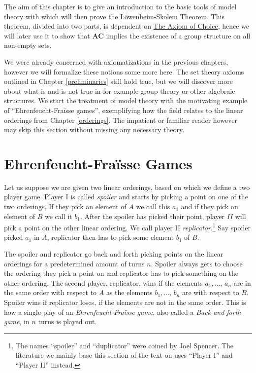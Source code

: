 \documentclass[../../main.tex]{subfiles}
\begin{document}
The aim of this chapter is to give an introduction to the basic tools of model theory with which will then prove the \hyperref[up-lowenheim-skolem]{Löwenheim-Skolem Theorem}.
This theorem, divided into two parts, is dependent on \hyperref[choice-axiom]{The Axiom of Choice}, 
hence we will later use it to show that \textbf{AC} implies the existence of a group structure on all non-empty sets.

We were already concerned with axiomatizations in the previous chapters, however we will formalize these notions some more here.
The set theory axioms outlined in Chapter \ref{preliminaries} still hold true, 
but we will discover more about what is and is not true in for example group theory or other algebraic structures.
We start the treatment of model theory with the motivating example of ``Ehrenfeucht-Fra\"isse games'', 
exemplifying how the field relates to the linear orderings from Chapter \ref{orderings}.
The impatient or familiar reader however may skip this section without missing any necessary theory.

\section{Ehrenfeucht-Fra\"isse Games}
Let us suppose we are given two linear orderings, based on which we define a two player game.
Player I is called \textit{spoiler} and starts by picking a point on one of the two orderings, 
If they pick an element of $A$ we call this $a_1$ and if they pick an element of $B$ we call it $b_1$.
After the spoiler has picked their point, player $II$ will pick a point on the other linear ordering. 
We call player II \textit{replicator}.\footnote{The names ``spoiler'' and ``duplicator'' were coined by Joel Spencer.\cite[\S 6]{Wil24}
The literature \cite{Ros82} we mainly base this section of the text on uses ``Player I'' and ``Player II'' instead.}
Say spoiler picked $a_1$ in $A$, replicator then has to pick some element $b_1$ of $B$.

The spoiler and replicator go back and forth picking points on the linear orderings for a predetermined amount of turns $n$.
Spoiler always gets to choose the ordering they pick a point on and replicator has to pick something on the other ordering.
The second player, replicator, wins if the elements $a_1,\ldots,\, a_n$ are in the same order with respect to $A$ as the elements $b_1,\ldots,\, b_n$ are with respect to $B$.
Spoiler wins if replicator loses, if the elements are not in the same order. 
This is how a single play of an \textit{Ehrenfeucht-Fra\"isse game}, also called a \textit{Back-and-forth game}, in $n$ turns is played out.
\end{document}
